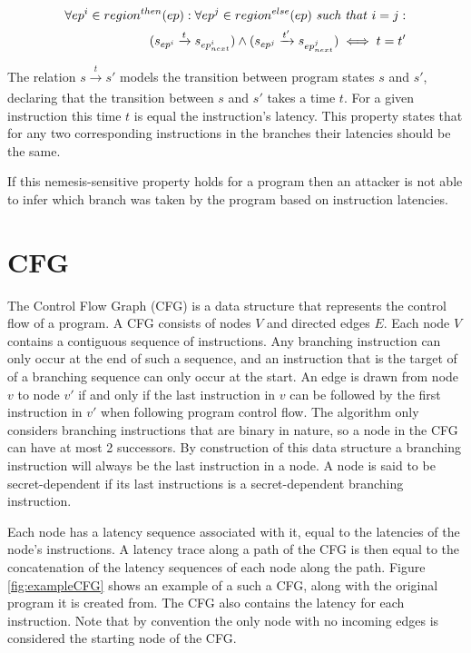 \begin{equation} \label{eq:nemesisProperty}
    \begin{split}
    \forall ep^i \in region^{then}(ep) : \forall ep^j \in region^{else}(ep) \text{ \textit{such that} } i=j :  \\ 
    (s_{ep^i} \xrightarrow[]{t} s_{ep^i_{next}}) \land (s_{ep^j} \xrightarrow[]{t'} s_{ep^j_{next}}) \iff t = t' \\ 
    \end{split}
\end{equation}

The relation $s \xrightarrow[]{t} s'$ models the transition between program states $s$ and $s'$, declaring that the transition between $s$ and $s'$ takes a time $t$. 
For a given instruction this time $t$ is equal the instruction's latency. This property states that for any two corresponding instructions in the branches their latencies should be the same.

If this nemesis-sensitive property holds for a program then an attacker is not able to infer which branch was taken by the program based on instruction latencies.

\section{CFG}\label{sec:cfg}
The Control Flow Graph (CFG) is a data structure that represents the control flow of a program. A CFG consists of nodes $V$ and directed edges $E$. Each node $V$ contains a 
contiguous sequence of instructions. Any branching instruction can only occur at the end of such a sequence, and an instruction that is the target of 
of a branching sequence can only occur at the start. 
An edge is drawn from node $v$ to node $v'$ if and only if the last instruction in $v$ can be followed by the first instruction in $v'$ 
when following program control flow. The algorithm only considers branching instructions that are binary in nature, so a node in the CFG can have at most 2 successors. 
By construction of this data structure a branching instruction will always be the last instruction in a node. A node is said to be secret-dependent if its last instructions is a 
secret-dependent branching instruction. 

Each node has a latency sequence associated with it, equal to the latencies of the node's instructions.  
A latency trace along a path of the CFG is then equal to the concatenation of the latency sequences of each node along the path.
Figure \ref{fig:exampleCFG} shows an example of a such a CFG, along with the original program it is created from. The CFG also contains the latency for each instruction. Note that by convention the only node with no incoming edges is considered the starting node of the CFG. 

